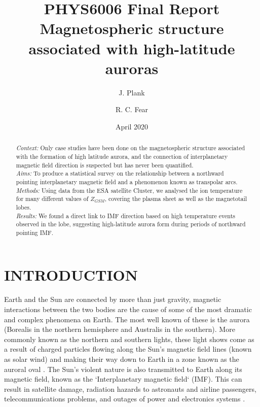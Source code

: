 \documentclass[12pt]{article}
\title{PHYS6006 Final Report \\
       Magnetospheric structure associated with high-latitude auroras}
\author[1]{J. Plank}
\author[2]{R. C. Fear}
\affil[1, 2]{Department of Physics and Astronomy, University of Southampton}
\date{April 2020}
\begin{document}
\sloppy
\maketitle

\begin{abstract}
    \noindent\textit{Context:} Only case studies have been done on the magnetospheric structure associated with the formation of high latitude aurora, and the connection of interplanetary magnetic field direction is suspected but has never been quantified.\\
    \textit{Aims:} To produce a statistical survey on the relationship between a northward pointing interplanetary magnetic field and a phenomenon known as transpolar arcs.\\
    \textit{Methods:} Using data from the ESA satellite Cluster, we analysed the ion temperature for many different values of $Z_{GSM}$, covering the plasma sheet as well as the magnetotail lobes.\\
    \textit{Results:} We found a direct link to IMF direction based on high temperature events observed in the lobe, suggesting high-latitude aurora form during periods of northward pointing IMF.
\end{abstract}

\pagebreak

\tableofcontents
{}
\bigskip
\listoffigures

\pagebreak


\section{INTRODUCTION}
Earth and the Sun are connected by more than just gravity, magnetic interactions between the two bodies are the cause of some of the most dramatic and complex phenomena on Earth. The most well known of these is the aurora (Borealis in the northern hemisphere and Australis in the southern). More commonly known as the northern and southern lights, these light shows come as a result of charged particles flowing along the Sun's magnetic field lines (known as solar wind) and making their way down to Earth in a zone known as the auroral oval \cite{AAAspaceweather}. The Sun's violent nature is also transmitted to Earth along its magnetic field, known as the `Interplanetary magnetic field` (IMF). This can result in satellite damage, radiation hazards to astronauts and airline passengers, telecommunications problems, and outages of power and electronics systems \cite{AAAspaceweather}.
\end{document}

